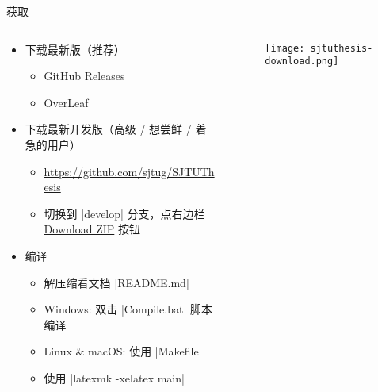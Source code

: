 \begin{frame}[fragile]{获取\SJTUThesis{}}
  \begin{columns}
    \begin{column}{.65\textwidth}
      \begin{itemize}
        \item 下载最新版（推荐）
              \begin{itemize}
                \item GitHub Releases 
                \item OverLeaf 
              \end{itemize}
        \item 下载最新开发版（高级 / 想尝鲜 / 着急的用户）
              \begin{itemize}
                \item \url{https://github.com/sjtug/SJTUThesis}
                \item 切换到 |develop| 分支，点右边栏
                      \href{https://github.com/sjtug/SJTUThesis/archive/dev.zip}%
                      {Download ZIP} 按钮
              \end{itemize}
        \item 编译
              \begin{itemize}
                \item 解压缩看文档 |README.md|
                \item Windows: 双击 |Compile.bat| 脚本编译
                \item Linux \& macOS: 使用 |Makefile|
                \item 使用 |latexmk -xelatex main|
              \end{itemize}
      \end{itemize}
    \end{column}
    \begin{column}{.25\textwidth}
      \begin{figure}[htbp]
        \centering
        \texttt{[image: sjtuthesis-download.png]}
      \end{figure}
      \vfill
    \end{column}
  \end{columns}
\end{frame}

